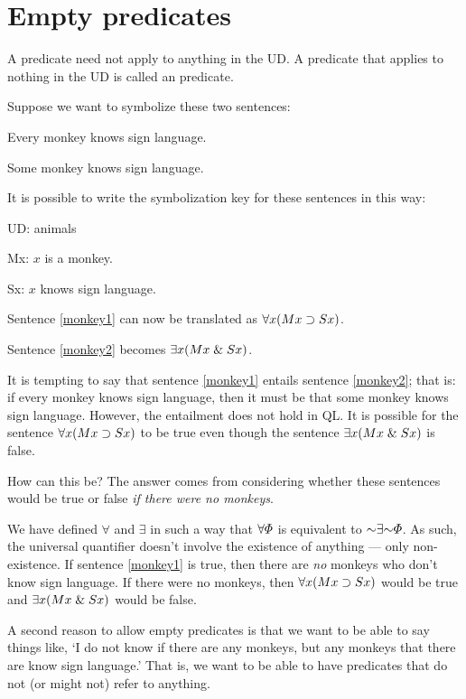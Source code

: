 

\section{Empty predicates}
A predicate need not apply to anything in the UD. A predicate that applies to nothing in the UD is called an  predicate.

Suppose we want to symbolize these two sentences:
\begin{earg}
\item[\ex{monkey1}]Every monkey knows sign language.
\item[\ex{monkey2}]Some monkey knows sign language.
\end{earg}
It is possible to write the symbolization key for these sentences in this way:
\begin{ekey}
\item[UD:] animals
\item[Mx:] $x$ is a monkey.
\item[Sx:] $x$ knows sign language.
\end{ekey}

Sentence \ref{monkey1} can now be translated as $\forall x(Mx \supset Sx)$.

Sentence \ref{monkey2} becomes $\exists x(Mx \mathrel\& Sx)$.

It is tempting to say that sentence \ref{monkey1} entails sentence \ref{monkey2}; that is: if every monkey knows sign language, then it must be that some monkey knows sign language. However, the entailment does not hold in QL. It is possible for the sentence $\forall x(Mx \supset Sx)$ to be true even though the sentence $\exists x(Mx \mathrel\& Sx)$ is false.

How can this be? The answer comes from considering whether these sentences would be true or false \emph{if there were no monkeys}.

We have defined $\forall$ and $\exists$ in such a way that $\forall\varPhi{}$ is equivalent to $\enot \exists\enot \metaA{}$. As such, the universal quantifier doesn't involve the existence of anything --- only non-existence. If sentence \ref{monkey1} is true, then there are \emph{no} monkeys who don't know sign language. If there were no monkeys, then $\forall x(Mx \supset Sx)$ would be true and $\exists x(Mx \mathrel\& Sx)$ would be false.

A second reason to allow empty predicates is that we want to be able to say things like, `I do not know if there are any monkeys, but any monkeys that there are know sign language.' That is, we want to be able to have predicates that do not (or might not) refer to anything.

